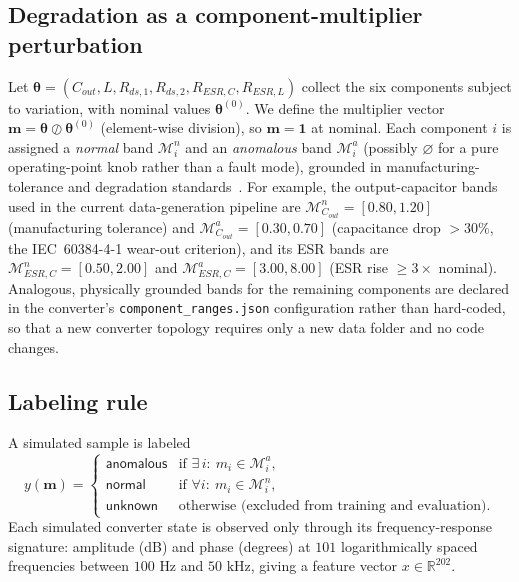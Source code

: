 \documentclass[11pt,a4paper]{article}
\begin{document}
\subsection{Degradation as a component-multiplier perturbation}
Let $\boldsymbol\theta=(C_{out}, L, R_{ds,1}, R_{ds,2}, R_{ESR,C}, R_{ESR,L})$ collect the
six components subject to variation, with nominal values $\boldsymbol\theta^{(0)}$. We
define the multiplier vector $\mathbf{m}=\boldsymbol\theta \oslash \boldsymbol\theta^{(0)}$
(element-wise division), so $\mathbf{m}=\mathbf 1$ at nominal. Each component $i$ is
assigned a \emph{normal} band $\mathcal M_i^n$ and an \emph{anomalous} band $\mathcal
M_i^a$ (possibly $\varnothing$ for a pure operating-point knob rather than a fault
mode), grounded in manufacturing-tolerance and degradation
standards~\cite{iec60384_1,waugh_dcbias,kulkarni2010electrolytic,celaya2011mosfet}. For
example, the output-capacitor bands used in the current data-generation pipeline are
$\mathcal M_{C_{out}}^n=[0.80,1.20]$ (manufacturing tolerance) and $\mathcal
M_{C_{out}}^a=[0.30,0.70]$ (capacitance drop $>30\%$, the IEC~60384-4-1 wear-out
criterion), and its ESR bands are $\mathcal M_{ESR,C}^n=[0.50,2.00]$ and $\mathcal
M_{ESR,C}^a=[3.00,8.00]$ (ESR rise $\ge 3\times$ nominal). Analogous, physically grounded
bands for the remaining components are declared in the converter's
\texttt{component\_ranges.json} configuration rather than hard-coded, so that a new
converter topology requires only a new data folder and no code changes.

\subsection{Labeling rule}
A simulated sample is labeled
\begin{equation}
y(\mathbf m)=
\begin{cases}
\textsf{anomalous} & \text{if } \exists\, i:\ m_i\in\mathcal M_i^a,\\
\textsf{normal} & \text{if } \forall i:\ m_i\in\mathcal M_i^n,\\
\textsf{unknown} & \text{otherwise (excluded from training and evaluation).}
\end{cases}
\label{eq:label-rule}
\end{equation}
Each simulated converter state is observed only through its frequency-response signature:
amplitude (dB) and phase (degrees) at $101$ logarithmically spaced frequencies between
$100\text{ Hz}$ and $50\text{ kHz}$, giving a feature vector $x\in\mathbb R^{202}$.
\end{document}
